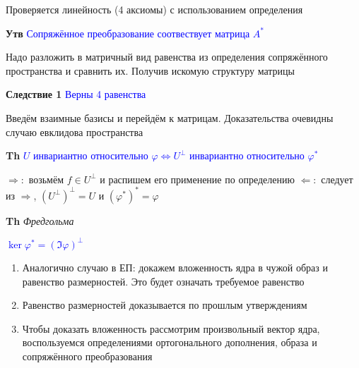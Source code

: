 \documentclass[a4paper, 14pt]{article}
\begin{document}
    Проверяется линейность (4 аксиомы) с использованием определения

    \textbf{Утв} \textcolor{blue}{Сопряжённое преобразование соотвествует матрица $A^*$}

    Надо разложить в матричный вид равенства из определения сопряжённого пространства и сравнить их.
    Получив искомую структуру матрицы

    \textbf{Следствие 1} \textcolor{blue}{Верны 4 равенства}

    Введём взаимные базисы и перейдём к матрицам.
    Доказательства очевидны случаю евклидова пространства

    \textbf{Th} \textcolor{blue}{$U$ инвариантно относительно $\varphi \Leftrightarrow U^\bot$ инвариантно относительно $\varphi^*$}

    $\Rightarrow:$ возьмём $f \in U^\bot$ и распишем его применение по определению
    $\Leftarrow:$ следует из $\Rightarrow$, $(U^\bot)^\bot = U$ и $(\varphi^*)^* = \varphi$

    \textbf{Th} \textit{Фредгольма}

    \textcolor{blue}{$\ker \varphi^* = (\Im \varphi)^\bot$}

    \begin{enumerate}
        \item Аналогично случаю в ЕП: докажем вложенность ядра в чужой образ и равенство размерностей.
        Это будет означать требуемое равенство
        \item Равенство размерностей доказывается по прошлым утверждениям
        \item Чтобы доказать вложенность рассмотрим произвольный вектор ядра, воспользуемся определениями
        ортогонального дополнения, образа и сопряжённого преобразования
    \end{enumerate}



    
\end{document}
